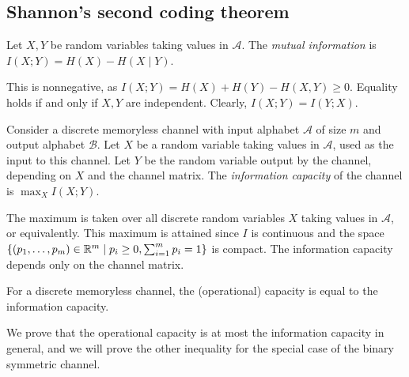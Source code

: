 \subsection{Shannon's second coding theorem}
\begin{definition}
    Let \( X, Y \) be random variables taking values in \( \mathcal A \).
    The \emph{mutual information} is \( I(X;Y) = H(X) - H(X \mid Y) \).
\end{definition}
This is nonnegative, as \( I(X;Y) = H(X) + H(Y) - H(X,Y) \geq 0 \).
Equality holds if and only if \( X, Y \) are independent.
Clearly, \( I(X;Y) = I(Y;X) \).
\begin{definition}
    Consider a discrete memoryless channel with input alphabet \( \mathcal A \) of size \( m \) and output alphabet \( \mathcal B \).
    Let \( X \) be a random variable taking values in \( \mathcal A \), used as the input to this channel.
    Let \( Y \) be the random variable output by the channel, depending on \( X \) and the channel matrix.
    The \emph{information capacity} of the channel is \( \max_{X} I(X;Y) \).
\end{definition}
The maximum is taken over all discrete random variables \( X \) taking values in \( \mathcal A \), or equivalently.
This maximum is attained since \( I \) is continuous and the space \( \qty{(p_1, \dots, p_m) \in \mathbb R^m \mid p_i \geq 0, \sum_{i=1}^m p_i = 1} \) is compact.
The information capacity depends only on the channel matrix.
\begin{theorem}
    For a discrete memoryless channel, the (operational) capacity is equal to the information capacity.
\end{theorem}
We prove that the operational capacity is at most the information capacity in general, and we will prove the other inequality for the special case of the binary symmetric channel.
